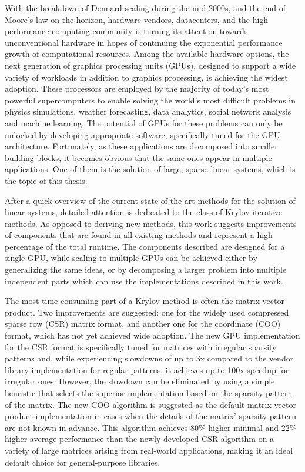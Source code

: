 With the breakdown of Dennard scaling during the mid-2000s, and the end of
Moore's law on the horizon, hardware vendors, datacenters, and the high
performance computing community is turning its attention towards unconventional
hardware in hopes of continuing the exponential performance growth of
computational resources. Among the available hardware options, the next
generation of graphics processing units (GPUs), designed to support a wide
variety of workloads in addition to graphics processing, is achieving the widest
adoption. These processors are employed by the majority of today's most powerful
supercomputers to enable solving the world's most difficult problems in physics
simulations, weather forecasting, data analytics, social network analysis and
machine learning. The potential of GPUs for these problems can only be unlocked
by developing appropriate software, specifically tuned for the GPU architecture.
Fortunately, as these applications are decomposed into smaller building blocks,
it becomes obvious that the same ones appear in multiple applications. One of
them is the solution of large, sparse linear systems, which is the topic of this
thesis.

After a quick overview of the current state-of-the-art methods for the solution
of linear systems, detailed attention is dedicated to the class of Krylov
iterative methods. As opposed to deriving new methods, this work suggests
improvements of components that are found in all existing methods and represent
a high percentage of the total runtime. The components described are designed
for a single GPU, while scaling to multiple GPUs can be achieved either by
generalizing the same ideas, or by decomposing a larger problem into multiple
independent parts which can use the implementations described in this work.

The most time-consuming part of a Krylov method is often the matrix-vector
product. Two improvements are suggested: one for the widely used compressed
sparse row (CSR) matrix format, and another one for the coordinate (COO) format,
which has not yet achieved wide adoption. The new GPU implementation for the CSR
format is specifically tuned for matrices with irregular sparsity patterns and,
while experiencing slowdowns of up to 3x compared to the vendor library
implementation for regular patterns, it achieves up to 100x speedup for
irregular ones.  However, the slowdown can be eliminated by using a simple
heuristic that selects the superior implementation based on the sparsity pattern
of the matrix.  The new COO algorithm is suggested as the default matrix-vector
product implementation in cases when the details of the matrix' sparsity pattern
are not known in advance. This algorithm achieves 80\% higher minimal and 22\%
higher average performance than the newly developed CSR algorithm on a variety
of large matrices arising from real-world applications, making it an ideal
default choice for general-purpose libraries.

